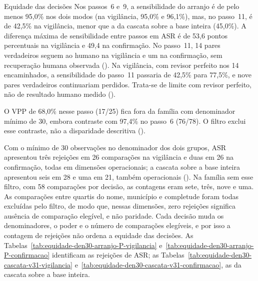 \begin{chapter}{Equidade das decisões}
Nos passos~6 e~9, a sensibilidade do arranjo é de pelo menos 95,0\% nos dois modos (na vigilância, 95,0\% e 96,1\%), mas, no passo~11, é de 42,5\% na vigilância, menor que a da cascata sobre a base inteira (45,0\%). A diferença máxima de sensibilidade entre passos em ASR é de 53,6 pontos percentuais na vigilância e 49,4 na confirmação. No passo~11, 14 pares verdadeiros seguem ao humano na vigilância e um na confirmação, sem recuperação humana observada (). Na vigilância, com revisor perfeito nos 14 encaminhados, a sensibilidade do passo~11 passaria de 42,5\% para 77,5\%, e nove pares verdadeiros continuariam perdidos. Trata-se de limite com revisor perfeito, não de resultado humano medido ().

O VPP de 68,0\% nesse passo (17/25) fica fora da família com denominador mínimo de 30, embora contraste com 97,4\% no passo~6 (76/78). O filtro exclui esse contraste, não a disparidade descritiva ().

Com o mínimo de 30 observações no denominador dos dois grupos, ASR apresentou três rejeições em 26 comparações na vigilância e duas em 26 na confirmação, todas em dimensões operacionais; a cascata sobre a base inteira apresentou seis em 28 e uma em 21, também operacionais (). Na família sem esse filtro, com 58 comparações por decisão, as contagens eram sete, três, nove e uma. As comparações entre quartis do nome, município e completude foram todas excluídas pelo filtro, de modo que, nessas dimensões, zero rejeições significa ausência de comparação elegível, e não paridade. Cada decisão muda os denominadores, o poder e o número de comparações elegíveis, e por isso a contagem de rejeições não ordena a equidade das decisões. As Tabelas~\ref{tab:equidade-den30-arranjo-P-vigilancia} e~\ref{tab:equidade-den30-arranjo-P-confirmacao} identificam as rejeições de ASR; as Tabelas~\ref{tab:equidade-den30-cascata-v31-vigilancia} e~\ref{tab:equidade-den30-cascata-v31-confirmacao}, as da cascata sobre a base inteira.








\end{chapter}
